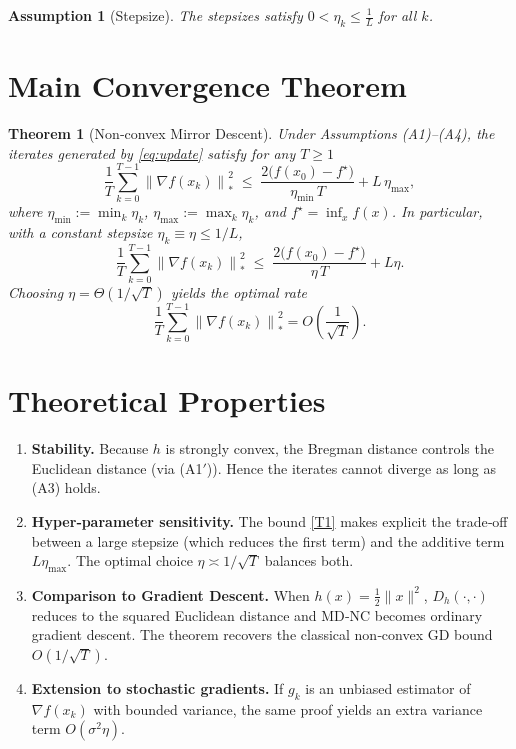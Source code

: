 \documentclass{article}
\newtheorem{theorem}{Theorem}
\newtheorem{assumption}{Assumption}
\newcommand{\norm}[1]{\left\lVert #1\right\rVert}
\newcommand{\breg}[2]{D_{h}\!\left(#1,#2\right)}
\newcommand{\gradf}{\nabla f}
\begin{document}
\begin{assumption}[Stepsize]
The stepsizes satisfy $0<\eta_k\le \frac{1}{L}$ for all $k$.
\end{assumption}

\section*{Main Convergence Theorem}
\begin{theorem}[Non‑convex Mirror Descent]\label{thm:main}
Under Assumptions (A1)–(A4), the iterates generated by \eqref{eq:update} satisfy for any $T\ge 1$
\[
\frac{1}{T}\sum_{k=0}^{T-1}\norm{\gradf(x_k)}_{*}^{2}
\;\le\;
\frac{2\bigl(f(x_0)-f^{\star}\bigr)}{\eta_{\min}\,T}
   +L\,\eta_{\max},
\tag{T1}
\]
where $\eta_{\min}:=\min_{k}\eta_k$, $\eta_{\max}:=\max_{k}\eta_k$, and $f^{\star}= \inf_{x}f(x)$.
In particular, with a constant stepsize $\eta_k\equiv \eta\le 1/L$,
\[
\frac{1}{T}\sum_{k=0}^{T-1}\norm{\gradf(x_k)}_{*}^{2}
\;\le\;
\frac{2\bigl(f(x_0)-f^{\star}\bigr)}{\eta\,T}+L\eta.
\tag{T2}
\]
Choosing $\eta=\Theta(1/\sqrt{T})$ yields the optimal rate
\[
\frac{1}{T}\sum_{k=0}^{T-1}\norm{\gradf(x_k)}_{*}^{2}=O\!\left(\frac{1}{\sqrt{T}}\right).
\]
\end{theorem}

\section*{Theoretical Properties}
\begin{enumerate}[leftmargin=*,label={\bf Property \arabic*:}]
\item \textbf{Stability.} Because $h$ is strongly convex, the Bregman distance controls the Euclidean distance (via (A1$'$)). Hence the iterates cannot diverge as long as (A3) holds.
\item \textbf{Hyper‑parameter sensitivity.} The bound \eqref{T1} makes explicit the trade‑off between a large stepsize (which reduces the first term) and the additive term $L\eta_{\max}$. The optimal choice $\eta\asymp 1/\sqrt{T}$ balances both.
\item \textbf{Comparison to Gradient Descent.} When $h(x)=\tfrac12\|x\|^{2}$, $\breg{\cdot}{\cdot}$ reduces to the squared Euclidean distance and MD‑NC becomes ordinary gradient descent. The theorem recovers the classical non‑convex GD bound $O(1/\sqrt{T})$.
\item \textbf{Extension to stochastic gradients.} If $g_k$ is an unbiased estimator of $\gradf(x_k)$ with bounded variance, the same proof yields an extra variance term $O(\sigma^{2}\eta)$.
\end{enumerate}
\end{document}
